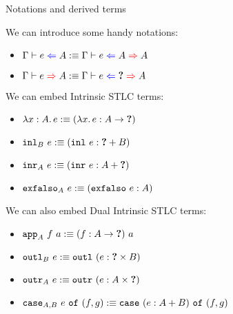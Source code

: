 \documentclass{beamer}
\begin{document}
\begin{frame}{Notations and derived terms}

We can introduce some handy notations:

\begin{itemize}
  \item $\check{e}{A} :\equiv \hinting{e}{A}{A}$
  \item $\infer{e}{A} :\equiv \hinting{e}{\Hole}{A}$
\end{itemize}

We can embed Intrinsic STLC terms:

\begin{itemize}
  \item $\lambda x : A.\, e :\equiv (\lambda x.\, e : A \to \textbf{?})$ \\
  \item $\texttt{inl}_{B}\ e :\equiv (\texttt{inl}\ e : \textbf{?} + B)$ \\
  \item $\texttt{inr}_{A}\ e :\equiv (\texttt{inr}\ e : A + \textbf{?})$ \\
  \item $\texttt{exfalso}_{A}\ e :\equiv (\texttt{exfalso}\ e : A)$
\end{itemize}

We can also embed Dual Intrinsic STLC terms:

\begin{itemize}
  \item $\texttt{app}_{A}\ f\ a :\equiv (f : A \to \textbf{?})\ a$
  \item $\texttt{outl}_{B}\ e :\equiv \texttt{outl}\ (e : \textbf{?} \times B)$
  \item $\texttt{outr}_{A}\ e :\equiv \texttt{outr}\ (e : A \times \textbf{?})$
  \item $\texttt{case}_{A, B}\ e\ \texttt{of}\ (f, g) :\equiv \texttt{case}\ (e : A + B)\ \texttt{of}\ (f, g)$
\end{itemize}

\end{frame}
\end{document}
